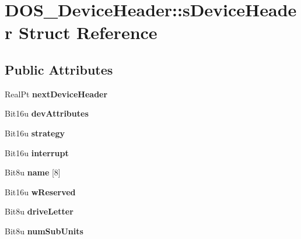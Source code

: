 \hypertarget{structDOS__DeviceHeader_1_1sDeviceHeader}{\section{D\-O\-S\-\_\-\-Device\-Header\-:\-:s\-Device\-Header Struct Reference}
\label{structDOS__DeviceHeader_1_1sDeviceHeader}
}
\subsection*{Public Attributes}
\begin{DoxyCompactItemize}
\item 
\hypertarget{structDOS__DeviceHeader_1_1sDeviceHeader_abbb1fd69a6bbf72fdd9170e20e544d00}{Real\-Pt {\bfseries next\-Device\-Header}}\label{structDOS__DeviceHeader_1_1sDeviceHeader_abbb1fd69a6bbf72fdd9170e20e544d00}

\item 
\hypertarget{structDOS__DeviceHeader_1_1sDeviceHeader_a187ecd57a69d00f0ebec64b78fceefd6}{Bit16u {\bfseries dev\-Attributes}}\label{structDOS__DeviceHeader_1_1sDeviceHeader_a187ecd57a69d00f0ebec64b78fceefd6}

\item 
\hypertarget{structDOS__DeviceHeader_1_1sDeviceHeader_a320bfd0269e4f232b33af700de25583c}{Bit16u {\bfseries strategy}}\label{structDOS__DeviceHeader_1_1sDeviceHeader_a320bfd0269e4f232b33af700de25583c}

\item 
\hypertarget{structDOS__DeviceHeader_1_1sDeviceHeader_a3d2565495471871ce4a400308e2eefc9}{Bit16u {\bfseries interrupt}}\label{structDOS__DeviceHeader_1_1sDeviceHeader_a3d2565495471871ce4a400308e2eefc9}

\item 
\hypertarget{structDOS__DeviceHeader_1_1sDeviceHeader_ad678f6c38caa5b031d2c24334e8a3f7e}{Bit8u {\bfseries name} \mbox{[}8\mbox{]}}\label{structDOS__DeviceHeader_1_1sDeviceHeader_ad678f6c38caa5b031d2c24334e8a3f7e}

\item 
\hypertarget{structDOS__DeviceHeader_1_1sDeviceHeader_a5bb6421199e0a54e762a80bb46e97be4}{Bit16u {\bfseries w\-Reserved}}\label{structDOS__DeviceHeader_1_1sDeviceHeader_a5bb6421199e0a54e762a80bb46e97be4}

\item 
\hypertarget{structDOS__DeviceHeader_1_1sDeviceHeader_abbcac594be2d7fb8ef17e9fbc945b326}{Bit8u {\bfseries drive\-Letter}}\label{structDOS__DeviceHeader_1_1sDeviceHeader_abbcac594be2d7fb8ef17e9fbc945b326}

\item 
\hypertarget{structDOS__DeviceHeader_1_1sDeviceHeader_a7493b77d5dfdae6057ba632deda22773}{Bit8u {\bfseries num\-Sub\-Units}}\label{structDOS__DeviceHeader_1_1sDeviceHeader_a7493b77d5dfdae6057ba632deda22773}

\end{DoxyCompactItemize}


